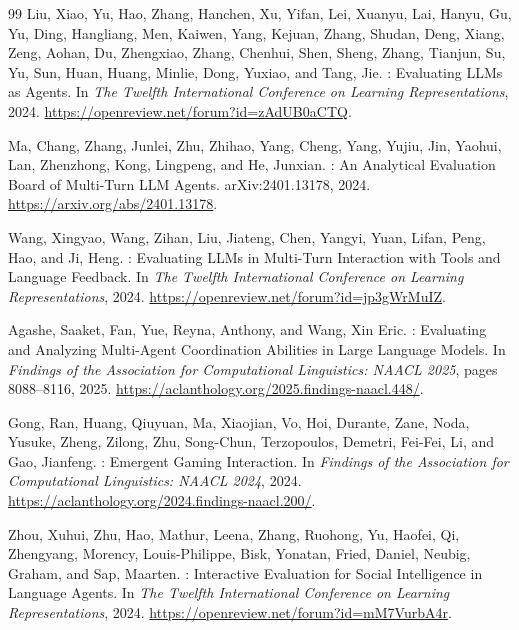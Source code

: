 \begin{thebibliography}{99}
Liu, Xiao, Yu, Hao, Zhang, Hanchen, Xu, Yifan, Lei, Xuanyu, Lai, Hanyu, Gu, Yu, Ding, Hangliang, Men, Kaiwen, Yang, Kejuan, Zhang, Shudan, Deng, Xiang, Zeng, Aohan, Du, Zhengxiao, Zhang, Chenhui, Shen, Sheng, Zhang, Tianjun, Su, Yu, Sun, Huan, Huang, Minlie, Dong, Yuxiao, and Tang, Jie.
: Evaluating LLMs as Agents.
\newblock In \emph{The Twelfth International Conference on Learning Representations}, 2024.
\newblock \url{https://openreview.net/forum?id=zAdUB0aCTQ}.

Ma, Chang, Zhang, Junlei, Zhu, Zhihao, Yang, Cheng, Yang, Yujiu, Jin, Yaohui, Lan, Zhenzhong, Kong, Lingpeng, and He, Junxian.
: An Analytical Evaluation Board of Multi-Turn LLM Agents.
\newblock arXiv:2401.13178, 2024.
\newblock \url{https://arxiv.org/abs/2401.13178}.

Wang, Xingyao, Wang, Zihan, Liu, Jiateng, Chen, Yangyi, Yuan, Lifan, Peng, Hao, and Ji, Heng.
: Evaluating LLMs in Multi-Turn Interaction with Tools and Language Feedback.
\newblock In \emph{The Twelfth International Conference on Learning Representations}, 2024.
\newblock \url{https://openreview.net/forum?id=jp3gWrMuIZ}.

Agashe, Saaket, Fan, Yue, Reyna, Anthony, and Wang, Xin Eric.
: Evaluating and Analyzing Multi-Agent Coordination Abilities in Large Language Models.
\newblock In \emph{Findings of the Association for Computational Linguistics: NAACL 2025}, pages 8088--8116, 2025.
\newblock \url{https://aclanthology.org/2025.findings-naacl.448/}.

Gong, Ran, Huang, Qiuyuan, Ma, Xiaojian, Vo, Hoi, Durante, Zane, Noda, Yusuke, Zheng, Zilong, Zhu, Song-Chun, Terzopoulos, Demetri, Fei-Fei, Li, and Gao, Jianfeng.
: Emergent Gaming Interaction.
\newblock In \emph{Findings of the Association for Computational Linguistics: NAACL 2024}, 2024.
\newblock \url{https://aclanthology.org/2024.findings-naacl.200/}.

Zhou, Xuhui, Zhu, Hao, Mathur, Leena, Zhang, Ruohong, Yu, Haofei, Qi, Zhengyang, Morency, Louis-Philippe, Bisk, Yonatan, Fried, Daniel, Neubig, Graham, and Sap, Maarten.
: Interactive Evaluation for Social Intelligence in Language Agents.
\newblock In \emph{The Twelfth International Conference on Learning Representations}, 2024.
\newblock \url{https://openreview.net/forum?id=mM7VurbA4r}.


\end{thebibliography}
